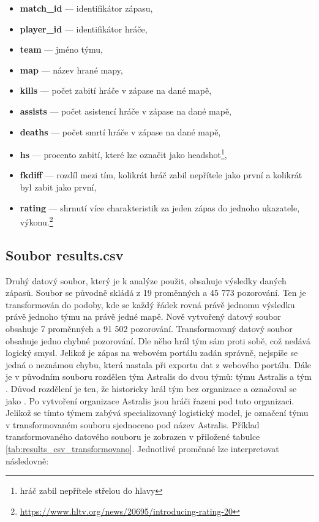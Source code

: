 \begin{itemize}
    \item \textbf{match\_id} --- identifikátor zápasu,
    \item \textbf{player\_id} --- identifikátor hráče,
    \item \textbf{team} --- jméno týmu,
    \item \textbf{map} --- název hrané mapy,
    \item \textbf{kills} --- počet zabití hráče v zápase na dané mapě,
    \item \textbf{assists} --- počet asistencí hráče v zápase na dané mapě,
    \item \textbf{deaths} --- počet smrtí hráče v zápase na dané mapě,
    \item \textbf{hs} --- procento zabití, které lze označit jako headshot\footnote{hráč zabil nepřítele střelou do hlavy},
    \item \textbf{fkdiff} --- rozdíl mezi tím, kolikrát hráč zabil nepřítele jako první a kolikrát byl zabit jako první,
    \item \textbf{rating} --- shrnutí více charakteristik za jeden zápas do jednoho ukazatele, výkonu.\footnote{\url{https://www.hltv.org/news/20695/introducing-rating-20}}
\end{itemize}

\subsection{Soubor results.csv}
Druhý datový soubor, který je k analýze použit, obsahuje výsledky daných zápasů. Soubor se původně skládá z 19 proměnných a 45 773 pozorování. Ten je transformován do podoby,
kde se každý řádek rovná právě jednomu výsledku právě jednoho týmu na právě jedné mapě. Nově vytvořený datový soubor obsahuje 7 proměnných a 91 502 pozorování.  
Transformovaný datový soubor obsahuje jedno chybné pozorování. Dle něho hrál tým sám proti sobě, což nedává logický smysl. Jelikož je zápas na webovém portálu zadán správně,
nejspíše se jedná o neznámou chybu, která nastala při exportu dat z webového portálu. Dále je v původním souboru rozdělen tým Astralis do dvou týmů: týmu Astralis a tým
. Důvod rozdělení je ten, že historicky hrál tým bez organizace a označoval se jako . Po vytvoření organizace Astralis jsou hráči řazeni pod tuto organizaci. Jelikož
se tímto týmem zabývá specializovaný logistický model, je označení týmu v transformovaném souboru sjednoceno pod název Astralis. Příklad transformovaného datového souboru
je zobrazen v přiložené tabulce \ref{tab:results_csv_transformovano}. Jednotlivé proměnné lze interpretovat následovně:

